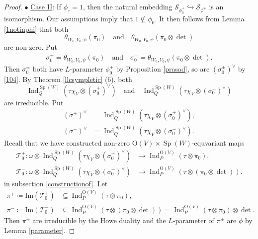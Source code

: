 \documentclass[article]{article}
\numberwithin{equation}{section}
\theoremstyle{definition}
\DeclareMathOperator{\Ind}{Ind}
\DeclareMathOperator{\SP}{Sp}
\begin{document}
\begin{proof}
	
	$\bullet$ \underline{Case II}: If $\phi_\tau= \mathrm 1$, then the natural embedding $\mathcal S_{\phi^+_{0}}\hookrightarrow \mathcal S_{\phi^+}$ is an isomorphism. Our assumptions imply that $\mathrm 1 \nsubseteq \phi_0$. It then follows from Lemma \ref{1notinphi} that both  $$\theta_{W_0,V_0,\psi}(\pi_{0})\quad \mbox{and}\quad \theta_{W_0,V_0,\psi}(\pi_{0}\otimes\det)$$ are non-zero. Put 
	\begin{align*}
	\sigma_0^+=\theta_{W_0,V_0,\psi}(\pi_{0})\quad\mbox{and}\quad  \sigma_0^-=\theta_{W_0,V_0,\psi}(\pi_{0}\otimes\det). 
	\end{align*} 
	Then $\sigma_0^{\pm}$ both have $L$-parameter $\phi_{0}^+$ by Proposition \ref{prasad}, so are $(\sigma_0^{\pm})^{\vee}$ by \ref{104}. By Theorem \ref{llcsympletic} (6), both 
	$$\Ind_{Q}^{\SP(W)}\left(\tau\chi_{V}\otimes \left(\sigma_{0}^{+}\right)^{\vee}\right)\quad \mbox{and}\quad \Ind_{Q}^{\SP(W)}\left(\tau\chi_{V}\otimes \left(\sigma_{0}^{-}\right)^{\vee}\right)$$ are irreducible. Put 
	\begin{align*}
	\left(\sigma^{+}\right)^{\vee}&= \Ind_{Q}^{\SP(W)}\left(\tau\chi_{V}\otimes \left(\sigma_{0}^{+}\right)^{\vee}\right),\\
	\left(\sigma^{-}\right)^{\vee}&= \Ind_{Q}^{\SP(W)}\left(\tau\chi_{V}\otimes \left(\sigma_{0}^{-}\right)^{\vee}\right).
	\end{align*}
  Recall that we have constructed non-zero $\mathrm O(V)\times \SP(W)$-equvariant maps 
	\begin{align*}
	\mathcal{T}_0^{+} : \omega \otimes \Ind_{Q}^{\SP(W)}\left(\tau\chi_{V}\otimes \left(\sigma_{0}^{+}\right)^{\vee}\right)  &\rightarrow \Ind_{P}^{\mathrm O\left(V\right)}\left(\tau  \otimes \pi_0\right),\\
	\mathcal{T}_0^{-} : \omega \otimes \Ind_{Q}^{\SP(W)}\left(\tau\chi_{V}\otimes \left(\sigma_{0}^{-}\right)^{\vee}\right)  &\rightarrow \Ind_{P}^{\mathrm O(V)}\left(\tau  \otimes (\pi_0\otimes\det)\right).
	\end{align*}
	in subsection \ref{constructionof}. Let 
	\begin{align*}
	\pi^{+} \coloneqq \mbox{Im}( \mathcal{T}_0^+)&\subseteq \Ind_{P}^{\mathrm O\left(V\right)}\left(\tau\otimes \pi_0\right),\\
	\pi^{-} \coloneqq \mbox{Im}( \mathcal{T}_0^-)&\subseteq \Ind_{P}^{\mathrm O\left(V\right)}\left(\tau\otimes (\pi_0\otimes\det)\right)=\Ind_{P}^{\mathrm O\left(V\right)}\left(\tau\otimes \pi_0\right)\otimes\det.
	\end{align*}
	Then $\pi^{\pm}$ are irreducible by the Howe duality and the $L$-parameter of $\pi^{\pm}$ are $\phi$ by Lemma \ref{parameter}.

\end{proof}
\end{document}
